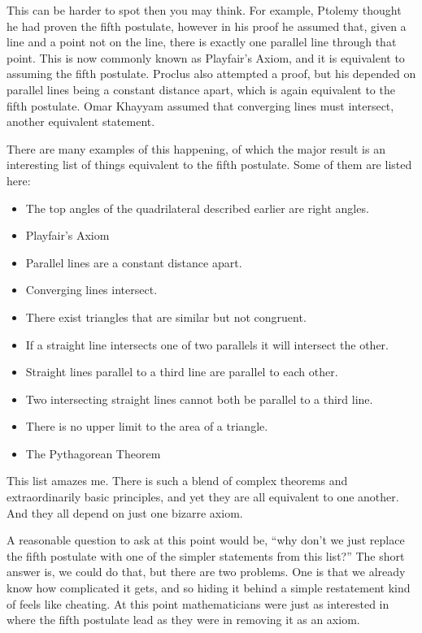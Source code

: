\documentclass[12pt]{article}
\begin{document}
This can be harder to spot then you may think. For example, Ptolemy thought he had proven the fifth postulate, however in his proof he assumed that, given a line and a point not on the line, there is exactly one parallel line through that point. This is now commonly known as Playfair's Axiom, and it is equivalent to assuming the fifth postulate. Proclus also attempted a proof, but his depended on parallel lines being a constant distance apart, which is again equivalent to the fifth postulate. Omar Khayyam assumed that converging lines must intersect, another equivalent statement.

There are many examples of this happening, of which the major result is an interesting list of things equivalent to the fifth postulate. Some of them are listed here:

\vspace{-.5cm}
\begin{itemize}
\item The top angles of the quadrilateral described earlier are right angles.
\item Playfair's Axiom
\item Parallel lines are a constant distance apart.
\item Converging lines intersect.
\item There exist triangles that are similar but not congruent.
\item If a straight line intersects one of two parallels it will intersect the other.
\item Straight lines parallel to a third line are parallel to each other.
\item Two intersecting straight lines cannot both be parallel to a third line.
\item There is no upper limit to the area of a triangle.
\item The Pythagorean Theorem
\end{itemize}

This list amazes me. There is such a blend of complex theorems and extraordinarily basic principles, and yet they are all equivalent to one another. And they all depend on just one bizarre axiom.

A reasonable question to ask at this point would be, ``why don't we just replace the fifth postulate with one of the simpler statements from this list?'' The short answer is, we could do that, but there are two problems. One is that we already know how complicated it gets, and so hiding it behind a simple restatement kind of feels like cheating. At this point mathematicians were just as interested in where the fifth postulate lead as they were in removing it as an axiom.
\end{document}

